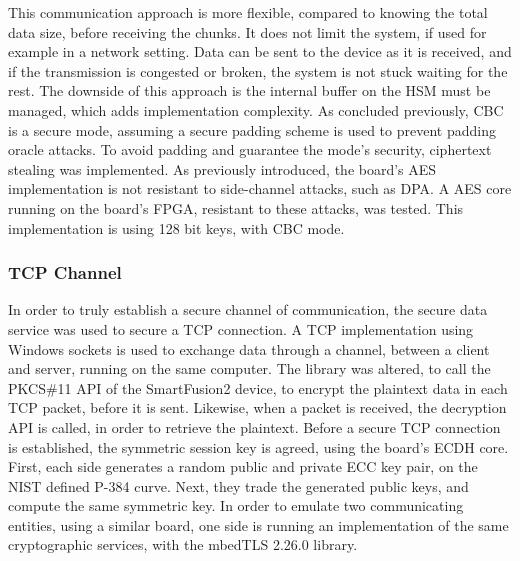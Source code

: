 This communication approach is more flexible, compared to knowing the total data size, before receiving the chunks. It does not limit the system, if used for example in a network setting. Data can be sent to the device as it is received, and if the transmission is congested or broken, the system is not stuck waiting for the rest. The downside of this approach is the internal buffer on the HSM must be managed, which adds implementation complexity.
As concluded previously, CBC is a secure mode, assuming a secure padding scheme is used to prevent padding oracle attacks. To avoid padding and guarantee the mode's security, ciphertext stealing was implemented.
As previously introduced, the board's AES implementation is not resistant to side-channel attacks, such as DPA. A AES core running on the board's FPGA, resistant to these attacks, was tested. This implementation is using 128 bit keys, with CBC mode.

\subsubsection*{TCP Channel}\label{chap:implementation:services:secure:tcp}

In order to truly establish a secure channel of communication, the secure data service was used to secure a TCP connection. A TCP implementation using Windows sockets is used to exchange data through a channel, between a client and server, running on the same computer. The library was altered, to call the PKCS\#11 API of the SmartFusion2 device, to encrypt the plaintext data in each TCP packet, before it is sent. Likewise, when a packet is received, the decryption API is called, in order to retrieve the plaintext.
Before a secure TCP connection is established, the symmetric session key is agreed, using the board's ECDH core. First, each side generates a random public and private ECC key pair, on the NIST defined P-384 curve. Next, they trade the generated public keys, and compute the same symmetric key. In order to emulate two communicating entities, using a similar board, one side is running an implementation of the same cryptographic services, with the mbedTLS 2.26.0 library.


